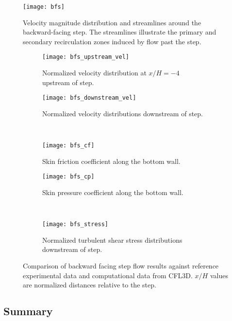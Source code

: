 \begin{figure}[htb!]
  \centering
  \texttt{[image: bfs]}
  \caption{Velocity magnitude distribution and streamlines around the backward-facing step. The
  streamlines illustrate the primary and secondary recirculation zones induced by flow past the
  step.}
  \label{fig:bfs}
\end{figure}

\begin{figure}[htb]
  \centering
  \hfill
  \begin{subfigure}[b]{0.369\columnwidth}
    \centering
    \texttt{[image: bfs\_upstream\_vel]}
    \caption{Normalized velocity distribution at $x/H=-4$ upstream of step.}
    \label{fig:bfs-upstream}
  \end{subfigure}
  \hfill
  \begin{subfigure}[b]{0.369\columnwidth}
    \centering
    \texttt{[image: bfs\_downstream\_vel]}
    \caption{Normalized velocity distributions downstream of step.}
    \label{fig:bfs-downstream}
  \end{subfigure} \hfill \\
  \centering
  \hfill
  \begin{subfigure}[b]{0.369\columnwidth}
    \centering
    \texttt{[image: bfs\_cf]}
    \caption{Skin friction coefficient along the bottom wall.}
    \label{fig:bfs-cf}
  \end{subfigure}
  \hfill
  \begin{subfigure}[b]{0.369\columnwidth}
    \centering
    \texttt{[image: bfs\_cp]}
    \caption{Skin pressure coefficient along the bottom wall.}
    \label{fig:bfs-cp}
  \end{subfigure} \hfill \\
  \centering
  \begin{subfigure}[b]{0.369\columnwidth}
    \centering
    \texttt{[image: bfs\_stress]}
    \caption{Normalized turbulent shear stress distributions downstream
    of step.}
    \label{fig:bfs-stress}
  \end{subfigure}
  \caption{Comparison of backward facing step flow results against reference
  experimental data and computational data from CFL3D. $x/H$ values are normalized
  distances relative to the step.}
  \label{fig:bfs-plots}
\end{figure}

\FloatBarrier

\subsection{Summary}


